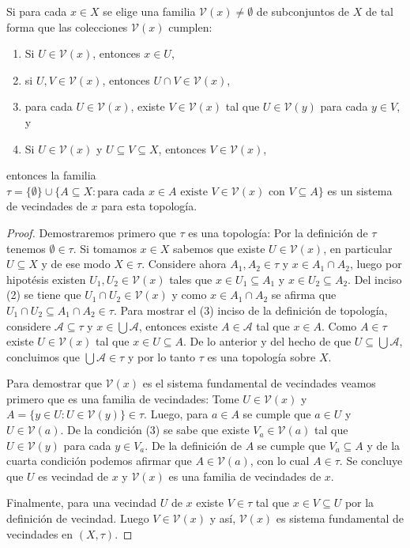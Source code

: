 \begin{proposicion}\label{pro:topologiaGenerada2}
Si para cada $x\in X$ se elige una familia $\mathcal{V}(x)\neq\emptyset$  de subconjuntos de $X$ de tal forma que las colecciones $\mathcal{V}(x)$ cumplen:
\begin{enumerate}
    \item Si $U\in\mathcal{V}(x)$, entonces $x\in U$,
    \item si $U,V\in\mathcal{V}(x)$, entonces $U\cap V\in\mathcal{V}(x)$,
    \item para cada $U\in\mathcal{V}(x)$, existe $V\in\mathcal{V}(x)$ tal que $U\in\mathcal{V}(y)$ para cada $y\in V$, y 
    \item Si $U\in\mathcal{V}(x)$ y $U\subseteq V\subseteq X$, entonces $V\in\mathcal{V}(x)$,
\end{enumerate}
entonces la familia $\tau=\{\emptyset\}\cup\{A\subseteq X:\text{para cada }x\in A\text{ existe }V\in\mathcal{V}(x)\text{ con }V\subseteq A\}$ es un sistema de vecindades de $x$ para esta topología.
\end{proposicion}
\begin{proof}
Demostraremos primero que $\tau$ es una topología: Por la definición de $\tau$ tenemos $\emptyset\in\tau$. Si tomamos $x\in X$ sabemos que existe $U\in\mathcal{V}(x)$, en particular $U\subseteq X$ y de ese modo $X\in\tau$. Considere ahora $A_1,A_2\in\tau$ y $x\in A_1\cap A_2$, luego por hipotésis existen $U_1,U_2\in\mathcal{V}(x)$ tales que $x\in U_1\subseteq A_1$ y $x\in U_2\subseteq A_2$. Del inciso (2) se tiene que $U_1\cap U_2\in\mathcal{V}(x)$ y como $x\in A_1\cap A_2$ se afirma que $U_1\cap U_2\subseteq A_1\cap A_2\in\tau$. Para mostrar el (3) inciso de la definición de topología, considere $\mathcal{A}\subseteq\tau$ y $x\in\bigcup\mathcal{A}$, entonces existe $A\in\mathcal{A}$ tal que $x\in A$. Como $A\in\tau$ existe $U\in\mathcal{V}(x)$ tal que $x\in U\subseteq A$. De lo anterior y del hecho de que $U\subseteq\bigcup\mathcal{A}$, concluimos que $\bigcup\mathcal{A}\in\tau$ y por lo tanto $\tau$ es una topología sobre $X$.

Para demostrar que $\mathcal{V}(x)$ es el sistema fundamental de vecindades veamos primero que es una familia de vecindades: Tome $U\in\mathcal{V}(x)$ y $A=\{y\in U:U\in\mathcal{V}(y)\}\in\tau$. Luego, para $a\in A$ se cumple que $a\in U$ y $U\in\mathcal{V}(a)$. De la condición (3) se sabe que existe $V_a\in\mathcal{V}(a)$ tal que $U\in\mathcal{V}(y)$ para cada $y\in V_a$. De la definición de $A$ se cumple que $V_a\subseteq A$ y de la cuarta condición podemos afirmar que $A\in\mathcal{V}(a)$, con lo cual $A\in\tau$. Se concluye que $U$ es vecindad de $x$ y $\mathcal{V}(x)$ es una familia de vecindades de $x$.

Finalmente, para una vecindad $U$ de $x$ existe $V\in\tau$ tal que $x\in V\subseteq U$ por la definición de vecindad. Luego $V\in\mathcal{V}(x)$ y así, $\mathcal{V}(x)$ es sistema fundamental de vecindades en $(X,\tau)$.
\end{proof}

